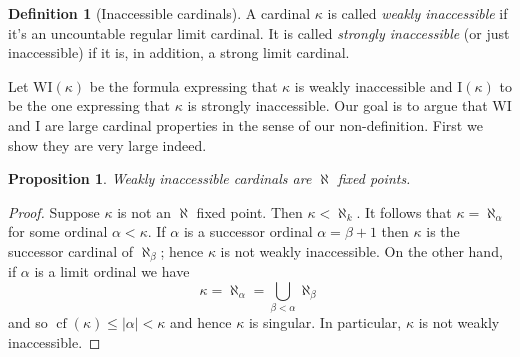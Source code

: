 \documentclass{report}
\DeclareMathOperator{\cf}{cf}
\theoremstyle{definition}
\theoremstyle{plain}
\newtheorem{prop}[thm]{Proposition}
\theoremstyle{definition}
\newtheorem{defn}[thm]{Definition}
\begin{document}
	\begin{defn}[Inaccessible cardinals]
		A cardinal $\kappa$ is called \emph{weakly inaccessible} if it's an uncountable regular limit cardinal. It is called \emph{strongly inaccessible} (or just inaccessible) if it is, in addition, a strong limit cardinal.
	\end{defn}
	Let $\text{WI}(\kappa)$ be the formula expressing that $\kappa$ is weakly inaccessible and $\text{I}(\kappa)$ to be the one expressing that $\kappa$ is strongly inaccessible. Our goal is to argue that WI and I are large cardinal properties in the sense of our non-definition. First we show they are very large indeed.
	\begin{prop}
		Weakly inaccessible cardinals are $\aleph$ fixed points.
	\end{prop}
	\begin{proof}
		Suppose $\kappa$ is not an $\aleph$ fixed point. Then $\kappa < \aleph_k$. It follows that $\kappa = \aleph_{\alpha}$ for some ordinal $\alpha < \kappa$. If $\alpha$ is a successor ordinal $\alpha = \beta + 1$ then $\kappa$ is the successor cardinal of $\aleph_\beta$; hence $\kappa$ is not weakly inaccessible. On the other hand, if $\alpha$ is a limit ordinal we have
		\[
			\kappa = \aleph_{\alpha} = \bigcup_{\beta < \alpha}\aleph_{\beta}
		\]
		and so $\cf(\kappa) \leq |\alpha| < \kappa$ and hence $\kappa$ is singular. In particular, $\kappa$ is not weakly inaccessible.
	\end{proof}
\end{document}
